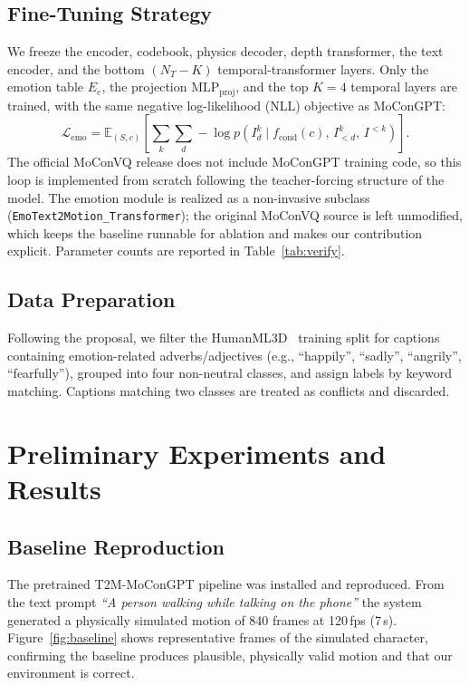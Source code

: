 \documentclass[conference]{IEEEtran}
\begin{document}
\subsection{Fine-Tuning Strategy}
We freeze the encoder, codebook, physics decoder, depth transformer, the text
encoder, and the bottom $(N_T-K)$ temporal-transformer layers. Only the
emotion table $E_e$, the projection $\text{MLP}_{\text{proj}}$, and the top
$K=4$ temporal layers are trained, with the same negative log-likelihood (NLL)
objective as MoConGPT:
\begin{equation}
  \mathcal{L}_{\text{emo}}=\mathbb{E}_{(S,c)}\!\left[\sum_{k}\sum_{d}
  -\log p\!\left(I^k_d \mid f_{\text{cond}}(c),\,I^k_{<d},\,I^{<k}\right)\right].
  \label{eq:nll}
\end{equation}
The official MoConVQ release does not include MoConGPT training code, so this
loop is implemented from scratch following the teacher-forcing structure of
the model. The emotion module is realized as a non-invasive subclass
(\texttt{EmoText2Motion\_Transformer}); the original MoConVQ source is left
unmodified, which keeps the baseline runnable for ablation and makes our
contribution explicit. Parameter counts are reported in
Table~\ref{tab:verify}.

\subsection{Data Preparation}
Following the proposal, we filter the HumanML3D~\cite{guo2022generating}
training split for captions containing emotion-related adverbs/adjectives
(e.g., ``happily'', ``sadly'', ``angrily'', ``fearfully''), grouped into four
non-neutral classes, and assign labels by keyword matching. Captions matching
two classes are treated as conflicts and discarded.

\section{Preliminary Experiments and Results}
\label{sec:exp}

\subsection{Baseline Reproduction}
The pretrained T2M-MoConGPT pipeline was installed and reproduced. From the
text prompt \textit{``A person walking while talking on the phone''} the system
generated a physically simulated motion of 840 frames at 120\,fps (7\,s).
Figure~\ref{fig:baseline} shows representative frames of the simulated
character, confirming the baseline produces plausible, physically valid
motion and that our environment is correct.
\end{document}
